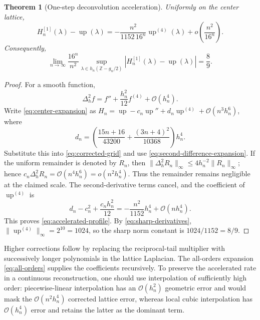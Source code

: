 \documentclass[11pt,oneside]{article}
\newtheorem{theorem}{Theorem}[section]
\theoremstyle{definition}
\theoremstyle{remark}
\newcommand{\Z}{\mathbb Z}
\newcommand{\Up}{\operatorname{up}}
\newcommand{\bigO}{\mathcal O}
\newcommand{\smallo}{o}
\newcommand{\Deltah}{\Delta_h}
\begin{document}
\begin{theorem}[One-step deconvolution acceleration]
\label{thm:accelerated}
Uniformly on the center lattice,
\begin{equation}
 H_n^{[1]}(\lambda)-\Up(\lambda)
 =-\frac{n^2}{1152\,16^n}\Up^{(4)}(\lambda)
  +\smallo\!\left(\frac{n^2}{16^n}\right).                \label{eq:accelerated-profile}
\end{equation}
Consequently,
\begin{equation}
 \lim_{n\to\infty}\frac{16^n}{n^2}
 \sup_{\lambda\in h_n(\Z-g_n/2)}
 |H_n^{[1]}(\lambda)-\Up(\lambda)|
 =\frac89.                                                 \label{eq:accelerated-norm}
\end{equation}
\end{theorem}

\begin{proof}
For a smooth function,
\begin{equation}
 \Deltah^2f=f''+\frac{h_n^2}{12}f^{(4)}+\bigO(h_n^4).      \label{eq:second-difference-expansion}
\end{equation}
Write \eqref{eq:center-expansion} as
$H_n=\Up-c_n\Up''+d_n\Up^{(4)}+\bigO(n^3h_n^6)$, where
\[
 d_n=\left(\frac{15n+16}{43200}
          +\frac{(3n+4)^2}{10368}\right)h_n^4.
\]
Substitute this into \eqref{eq:corrected-grid} and use
\eqref{eq:second-difference-expansion}.  If the uniform remainder is denoted by $R_n$, then
$\|\Deltah^2R_n\|_\infty\le4h_n^{-2}\|R_n\|_\infty$; hence
$c_n\Deltah^2R_n=\bigO(n^4h_n^6)=\smallo(n^2h_n^4)$.  Thus the remainder remains negligible
at the claimed scale.  The second-derivative terms cancel, and the coefficient of
$\Up^{(4)}$ is
\begin{equation*}
 d_n-c_n^2+\frac{c_nh_n^2}{12}
 =-\frac{n^2}{1152}h_n^4+\bigO(nh_n^4).
\end{equation*}
This proves \eqref{eq:accelerated-profile}.  By \eqref{eq:sharp-derivatives},
$\|\Up^{(4)}\|_\infty=2^{10}=1024$, so the sharp norm constant is
$1024/1152=8/9$.
\end{proof}

Higher corrections follow by replacing the reciprocal-tail multiplier with successively
longer polynomials in the lattice Laplacian.  The all-orders expansion
\eqref{eq:all-orders} supplies the coefficients recursively.  To preserve the accelerated
rate in a continuous reconstruction, one should use interpolation of sufficiently high order:
piecewise-linear interpolation has an $\bigO(h_n^2)$ geometric error and would mask the
$\bigO(n^2h_n^4)$ corrected lattice error, whereas local cubic interpolation has
$\bigO(h_n^4)$ error and retains the latter as the dominant term.
\end{document}
